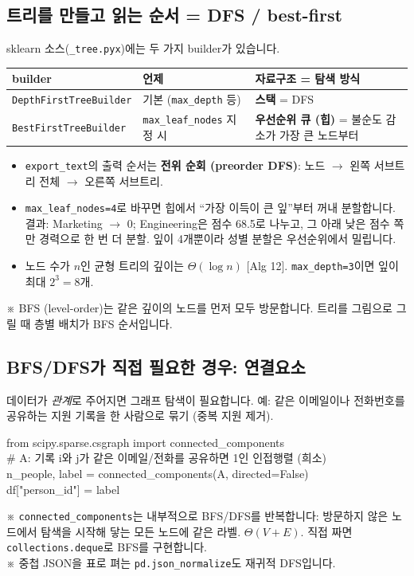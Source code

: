 \documentclass[11pt,a4paper]{article}
\newcommand{\code}[1]{\texttt{#1}}
\newcommand{\aref}[1]{{\footnotesize\textsf{\color{blue!55!black}[Alg #1]}}}
\newcommand{\aside}[1]{{\footnotesize\color{black!65}#1}}
\begin{document}
\subsection{트리를 만들고 읽는 순서 = DFS / best-first}
sklearn 소스(\code{\_tree.pyx})에는 두 가지 builder가 있습니다.
\begin{center}
\begin{tabular}{@{}l p{3.4cm} p{5.6cm}@{}}
\toprule
builder & 언제 & 자료구조 = 탐색 방식 \\
\midrule
\code{DepthFirstTreeBuilder} & 기본 (\code{max\_depth} 등) & \textbf{스택} = DFS \\
\code{BestFirstTreeBuilder} & \code{max\_leaf\_nodes} 지정 시 & \textbf{우선순위 큐 (힙)} = 불순도 감소가 가장 큰 노드부터 \\
\bottomrule
\end{tabular}
\end{center}
\begin{itemize}
\item \code{export\_text}의 출력 순서는 \textbf{전위 순회 (preorder DFS)}: 노드 $\to$ 왼쪽 서브트리 전체 $\to$ 오른쪽 서브트리.
\item \code{max\_leaf\_nodes=4}로 바꾸면 힙에서 ``가장 이득이 큰 잎''부터 꺼내 분할합니다. 결과: Marketing $\to$ 0; Engineering은 점수 68.5로 나누고, 그 아래 낮은 점수 쪽만 경력으로 한 번 더 분할. 잎이 4개뿐이라 성별 분할은 우선순위에서 밀립니다.
\item 노드 수가 $n$인 균형 트리의 깊이는 $\Theta(\log n)$ \aref{12}. \code{max\_depth=3}이면 잎이 최대 $2^3=8$개.
\end{itemize}
\aside{※ BFS (level-order)는 같은 깊이의 노드를 먼저 모두 방문합니다. 트리를 그림으로 그릴 때 층별 배치가 BFS 순서입니다.}

\subsection{BFS/DFS가 직접 필요한 경우: 연결요소}
데이터가 \emph{관계}로 주어지면 그래프 탐색이 필요합니다. 예: 같은 이메일이나 전화번호를 공유하는 지원 기록을 한 사람으로 묶기 (중복 지원 제거).
\begin{codebox}
from scipy.sparse.csgraph import connected\_components\\
\# A: 기록 i와 j가 같은 이메일/전화를 공유하면 1인 인접행렬 (희소)\\
n\_people, label = connected\_components(A, directed=False)\\
df["person\_id"] = label
\end{codebox}
\aside{※ \code{connected\_components}는 내부적으로 BFS/DFS를 반복합니다: 방문하지 않은 노드에서 탐색을 시작해 닿는 모든 노드에 같은 라벨. $\Theta(V+E)$. 직접 짜면 \code{collections.deque}로 BFS를 구현합니다.}\\
\aside{※ 중첩 JSON을 표로 펴는 \code{pd.json\_normalize}도 재귀적 DFS입니다.}
\end{document}
